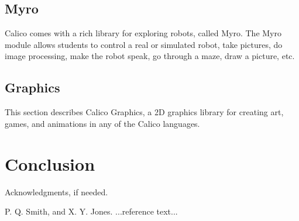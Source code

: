 \documentclass[preprint]{sigplanconf}
\begin{document}
\subsection{Myro}

Calico comes with a rich library for exploring robots, called
Myro. The Myro module allows students to control a real or simulated
robot, take pictures, do image processing, make the robot speak, go
through a maze, draw a picture, etc.

\subsection{Graphics}

This section describes Calico Graphics, a 2D graphics library for
creating art, games, and animations in any of the Calico languages.

\section{Conclusion}



\acks

Acknowledgments, if needed.





\begin{thebibliography}{}
\softraggedright

P. Q. Smith, and X. Y. Jones. ...reference text...





\end{thebibliography}
\end{document}
